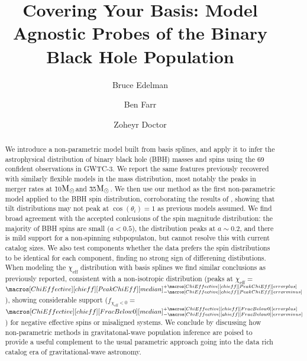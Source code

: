 \documentclass[twocolumn, linenumbers]{aastex631}
\newcommand{\msun}{\ensuremath{{\rm M}_\odot}}
\newcommand{\result}[1]{\textcolor{red}{#1}}
\newcommand{\CIPlusMinus}[1]{{#1[median]^{+#1[error plus]}_{-#1[error minus]}}}
\begin{document}
\title{Covering Your Basis: Model Agnostic Probes of the Binary Black Hole Population}

\author{Bruce Edelman}

\author{Ben Farr}

\author{Zoheyr Doctor}




\begin{abstract}                 
We introduce a non-parametric model built from basis splines, and apply it to infer the astrophysical distribution of 
binary black hole (BBH) masses and spins using the 69 confident observations in GWTC-3. We report the same features previously recovered 
with similarly flexible models in the mass distribution, most notably the peaks in merger rates at \~10\msun and \~35\msun. 
We then use our method as the first non-parametric model applied to the BBH spin distribution, corroborating the results of \citet{spinitasyoulike}, 
showing that tilt distributions may not peak at $\cos(\theta_i) = 1$ as previous models assumed. We find broad agreement with the 
accepted conlcusions of the spin magnitude distribution: the majority of BBH spins are small ($a<0.5$), the distribution peaks at $a\sim0.2$, 
and there is mild support for a non-spinning subpopulaton, but cannot resolve this with current catalog sizes. We also test components whether the data 
prefers the spin distributions to be identical for each component, finding no strong sign of differening distibutions. When modeling the $\chi_\mathrm{eff}$ 
distribution with basis splines we find similar conclusions as previously reported, consistent with a non-isotropic distribution 
(peaks at $\chi_\mathrm{eff}=\,$\result{$\CIPlusMinus{\macros[ChiEffective][chieff][PeakChiEff]}$}), showing considerable support 
($f_{\chi_\mathrm{eff}<0}=\,$\result{$\CIPlusMinus{\macros[ChiEffective][chieff][FracBelow0]}$}) for negative effective spins or misaligned systems.
We conclude by discussing how non-parametric methods in gravitatonal-wave population inference are poised to provide a useful complement to 
the usual parametric approach going into the data rich catalog era of gravitational-wave astronomy.
\end{abstract}
\end{document}
